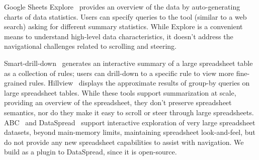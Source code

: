 Google Sheets Explore~\cite{web:explore} provides
an overview of the data by
auto-generating charts of data statistics.
Users can specify queries to the tool
(similar to a web search)
asking for different summary statistics.
While Explore
is a convenient means to understand
high-level data characteristics,
it doesn't address the
navigational challenges
related to scrolling and steering.  
 

Smart-drill-down~\cite{joglekar2015smart}
generates an interactive summary of a large spreadsheet table as
a collection of rules; users can drill-down to
a specific rule to view more fine-grained rules.
Hillview~\cite{web:hillview} displays
the approximate results of group-by queries
on large spreadsheet tables.
While these tools support summarization at scale,
providing an overview of the spreadsheet,
they don't preserve spreadsheet semantics,
nor do they make it easy to scroll or steer
through large spreadsheets.
ABC~\cite{Raman99scalablespreadsheets} and {\sc DataSpread}~\cite{datamodels} support interactive
exploration of very large spreadsheet datasets,
beyond main-memory limits, maintaining spreadsheet look-and-feel,
but do not provide any new spreadsheet capabilities to assist
with navigation.
We build \noah as a plugin
to {\sc DataSpread}, since it is open-source.

